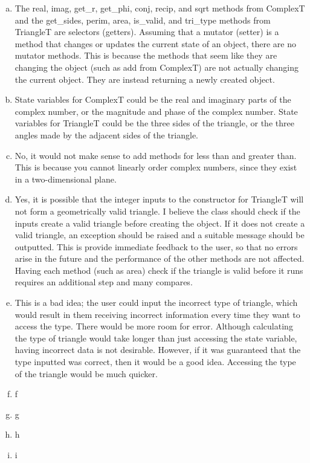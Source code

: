 \documentclass[12pt]{article}
\begin{document}
\begin{enumerate}[(a)]

\item The real, imag, get\_r, get\_phi, conj, recip, and sqrt methods from ComplexT and the get\_sides, perim, area, is\_valid, and tri\_type methods from TriangleT are selectors (getters). Assuming that a mutator (setter) is a method that changes or updates the current state of an object, there are no mutator methods. This is because the methods that seem like they are changing the object (such as add from ComplexT) are not actually changing the current object. They are instead returning a newly created object.
\item State variables for ComplexT could be the real and imaginary parts of the complex number, or the magnitude and phase of the complex number. State variables for TriangleT could be the three sides of the triangle, or the three angles made by the adjacent sides of the triangle.
\item No, it would not make sense to add methods for less than and greater than. This is because you cannot linearly order complex numbers, since they exist in a two-dimensional plane.
\item Yes, it is possible that the integer inputs to the constructor for TriangleT will not form a geometrically valid triangle. I believe the class should check if the inputs create a valid triangle before creating the object. If it does not create a valid triangle, an exception should be raised and a suitable message should be outputted. This is provide immediate feedback to the user, so that no errors arise in the future and the performance of the other methods are not affected. Having each method (such as area) check if the triangle is valid before it runs requires an additional step and many compares. 
\item This is a bad idea; the user could input the incorrect type of triangle, which would result in them receiving incorrect information every time they want to access the type. There would be more room for error. Although calculating the type of triangle would take longer than just accessing the state variable, having incorrect data is not desirable. However, if it was guaranteed that the type inputted was correct, then it would be a good idea. Accessing the type of the triangle would be much quicker.
\item f
\item g
\item h
\item i

\end{enumerate}
\end{document}
